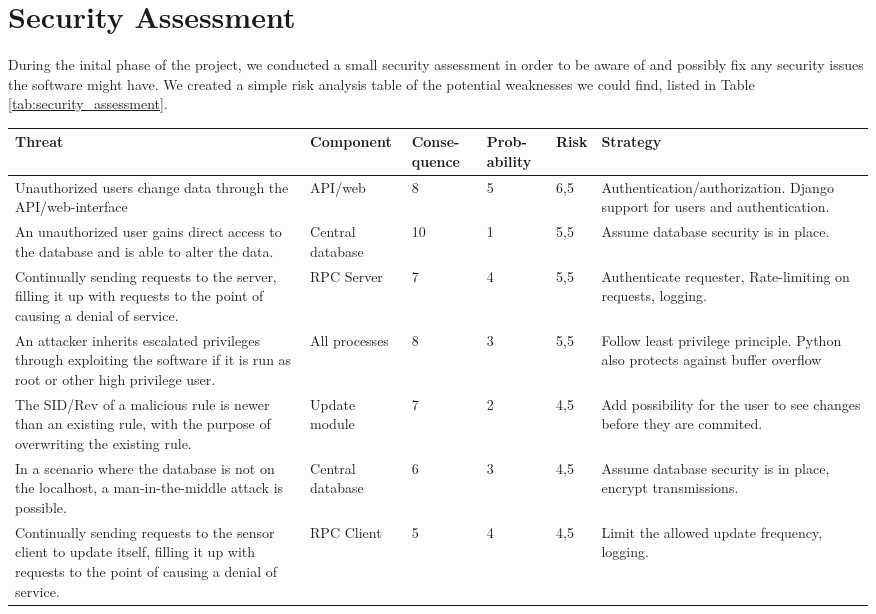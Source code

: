 \section{Security Assessment}
During the inital phase of the project, we conducted a small security assessment
in order to be aware of and possibly fix any security issues the software might have. We created a simple risk analysis table of the
potential weaknesses we could find, listed in Table
\ref{tab:security_assessment}.

\renewcommand{\arraystretch}{1.5}
\begin{table}[h]
  \centering
  \hspace*{-4cm}\begin{tabular}{p{4cm}|p{2cm}|p{1cm}|p{1cm}|p{1cm}|p{4cm}}
	Threat & Component & Conse-quence & Prob-ability & Risk & Strategy \\
	\hline
	{Unauthorized users change data through the
	API/web-interface } & {API/web} & {8} & {5} & {6,5} &
	{Authentication/authorization. Django support for users and authentication.} \\
	{An unauthorized user gains direct access to the
	database and is able to alter the data.} & {Central database} & {10} & {1} & {5,5} & {Assume database security is in place.} \\
	{Continually sending requests to the server, filling it
	up with requests to the point of causing a denial of service.} & {RPC Server} & {7} & {4} & {5,5} & {Authenticate requester, Rate-limiting on requests, logging.} \\
	{An attacker inherits escalated privileges through
	exploiting the software if it is run as root or other high privilege user.} & {All processes} & {8} & {3} & {5,5} & {Follow least privilege principle. Python also protects against buffer overflow} \\
	{The SID/Rev of a malicious rule is newer than an
	existing rule, with the purpose of overwriting the existing rule.} & {Update module} & {7} & {2} & {4,5} & {Add possibility for the user to see changes before they are commited.} \\
	{In a scenario where the database is not on the
	localhost, a man-in-the-middle attack is possible.} & {Central database} & {6} & {3} & {4,5} & {Assume database security is in place, encrypt transmissions.} \\
	{Continually sending requests to the sensor client to
	update itself, filling it up with requests to the point of causing a denial of service.} & {RPC Client} & {5} & {4} & {4,5} & {Limit the allowed update frequency, logging.} \\

\end{tabular}
\end{table}
